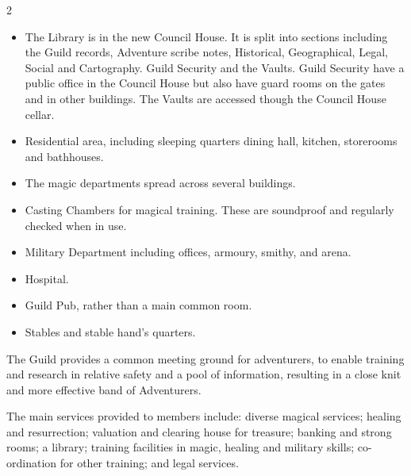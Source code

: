 \begin{multicols}{2}
\begin{itemize}
\item The Library is in the new Council House. It is split into
  sections including the Guild records, Adventure scribe notes,
  Historical, Geographical, Legal, Social and Cartography.  Guild
  Security and the Vaults. Guild Security have a public office in the
  Council House but also have guard rooms on the gates and in other
  buildings. The Vaults are accessed though the Council House cellar.

\item Residential area, including sleeping quarters dining hall,
  kitchen, storerooms and bathhouses.

\item The magic departments spread across several buildings.

\item Casting Chambers for magical training. These are soundproof and
  regularly checked when in use.

\item Military Department including offices, armoury, smithy, and
  arena.

\item Hospital.

\item Guild Pub, rather than a main common room.

\item Stables and stable hand’s quarters.

\end{itemize}

The Guild provides a common meeting ground for adventurers, to enable
training and research in relative safety and a pool of information,
resulting in a close knit and more effective band of Adventurers.

The main services provided to members include: diverse magical
services; healing and resurrection; valuation and clearing house for
treasure; banking and strong rooms; a library; training facilities in
magic, healing and military skills; co-ordination for other training;
and legal services.

\end{multicols}
